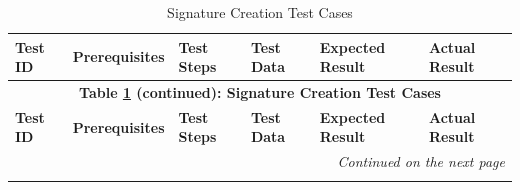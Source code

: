 \documentclass[]{final_report}
\theoremstyle{definition}
\begin{document}
\begin{longtable}{|l|p{2.5cm}|p{2.8cm}|p{2cm}|p{2cm}|p{2cm}|}
  \caption{Signature Creation Test Cases} \label{tab:signature_creation} \\
  \hline
  \textbf{Test ID} & \textbf{Prerequisites} & \textbf{Test Steps} & \textbf{Test Data} & \textbf{Expected Result} & \textbf{Actual Result} \\
  \hline
  \endfirsthead

  \multicolumn{6}{c}{\textbf{Table \ref{tab:signature_creation} (continued): Signature Creation Test Cases}} \\
  \hline
  \textbf{Test ID} & \textbf{Prerequisites} & \textbf{Test Steps} & \textbf{Test Data} & \textbf{Expected Result} & \textbf{Actual Result} \\
  \hline
  \endhead

  \hline
  \multicolumn{6}{r}{\textit{Continued on the next page}} \\
  \endfoot

  \hline
  \endlastfoot


\end{longtable}
\end{document}
